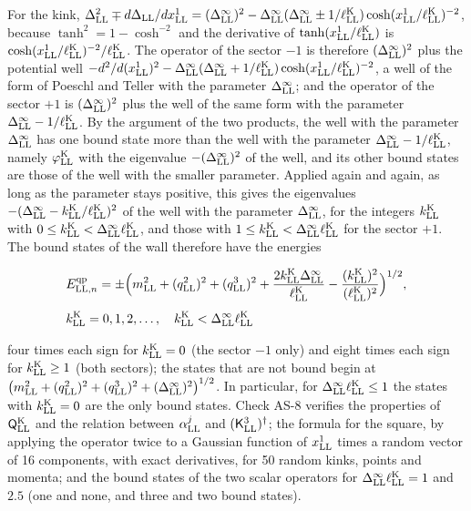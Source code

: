 \documentclass[
  10pt,
]{article}
\begin{document}
For the kink,
\(\Delta_{\rm LL}^2\mp d\Delta_{\rm LL}/dx^1_{\rm LL}=(\Delta^\infty_{\rm LL})^2-\Delta^\infty_{\rm LL}(\Delta^\infty_{\rm LL}\pm1/\ell^{\rm K}_{\rm LL})\cosh(x^1_{\rm LL}/\ell^{\rm K}_{\rm LL})^{-2}\),
because \(\tanh^2=1-\cosh^{-2}\) and the derivative of
\(\tanh(x^1_{\rm LL}/\ell^{\rm K}_{\rm LL})\) is
\(\cosh(x^1_{\rm LL}/\ell^{\rm K}_{\rm LL})^{-2}/\ell^{\rm K}_{\rm LL}\).
The operator of the sector \(-1\) is therefore
\((\Delta^\infty_{\rm LL})^2\) plus the potential well
\(-d^2/d(x^1_{\rm LL})^2-\Delta^\infty_{\rm LL}(\Delta^\infty_{\rm LL}+1/\ell^{\rm K}_{\rm LL})\cosh(x^1_{\rm LL}/\ell^{\rm K}_{\rm LL})^{-2}\),
a well of the form of Poeschl and Teller with the parameter
\(\Delta^\infty_{\rm LL}\); and the operator of the sector \(+1\) is
\((\Delta^\infty_{\rm LL})^2\) plus the well of the same form with the
parameter \(\Delta^\infty_{\rm LL}-1/\ell^{\rm K}_{\rm LL}\). By the
argument of the two products, the well with the parameter
\(\Delta^\infty_{\rm LL}\) has one bound state more than the well with
the parameter \(\Delta^\infty_{\rm LL}-1/\ell^{\rm K}_{\rm LL}\), namely
\(\varphi^{\rm K}_{\rm LL}\) with the eigenvalue
\(-(\Delta^\infty_{\rm LL})^2\) of the well, and its other bound states
are those of the well with the smaller parameter. Applied again and
again, as long as the parameter stays positive, this gives the
eigenvalues
\(-(\Delta^\infty_{\rm LL}-k^{\rm K}_{\rm LL}/\ell^{\rm K}_{\rm LL})^2\)
of the well with the parameter \(\Delta^\infty_{\rm LL}\), for the
integers \(k^{\rm K}_{\rm LL}\) with
\(0\le k^{\rm K}_{\rm LL}<\Delta^\infty_{\rm LL}\ell^{\rm K}_{\rm LL}\),
and those with
\(1\le k^{\rm K}_{\rm LL}<\Delta^\infty_{\rm LL}\ell^{\rm K}_{\rm LL}\)
for the sector \(+1\). The bound states of the wall therefore have the
energies

\[\begin{aligned}&E^{\rm qp}_{{\rm LL},n}=\pm\Big(m_{\rm LL}^2+(q^2_{\rm LL})^2+(q^3_{\rm LL})^2+\frac{2k^{\rm K}_{\rm LL}\Delta^\infty_{\rm LL}}{\ell^{\rm K}_{\rm LL}}-\frac{(k^{\rm K}_{\rm LL})^2}{(\ell^{\rm K}_{\rm LL})^2}\Big)^{1/2},\\[4pt]&k^{\rm K}_{\rm LL}=0,1,2,\dots,\quad k^{\rm K}_{\rm LL}<\Delta^\infty_{\rm LL}\ell^{\rm K}_{\rm LL}\end{aligned}\]

four times each sign for \(k^{\rm K}_{\rm LL}=0\) (the sector \(-1\)
only) and eight times each sign for \(k^{\rm K}_{\rm LL}\ge1\) (both
sectors); the states that are not bound begin at
\(\big(m_{\rm LL}^2+(q^2_{\rm LL})^2+(q^3_{\rm LL})^2+(\Delta^\infty_{\rm LL})^2\big)^{1/2}\).
In particular, for \(\Delta^\infty_{\rm LL}\ell^{\rm K}_{\rm LL}\le1\)
the states with \(k^{\rm K}_{\rm LL}=0\) are the only bound states.
Check AS-8 verifies the properties of \(\mathsf Q^{\rm K}_{\rm LL}\) and
the relation between \(\alpha^j_{\rm LL}\) and
\((\mathsf K^3_{\rm LL})^\dagger\); the formula for the square, by
applying the operator twice to a Gaussian function of \(x^1_{\rm LL}\)
times a random vector of 16 components, with exact derivatives, for 50
random kinks, points and momenta; and the bound states of the two scalar
operators for \(\Delta^\infty_{\rm LL}\ell^{\rm K}_{\rm LL}=1\) and
\(2.5\) (one and none, and three and two bound states).
\end{document}
